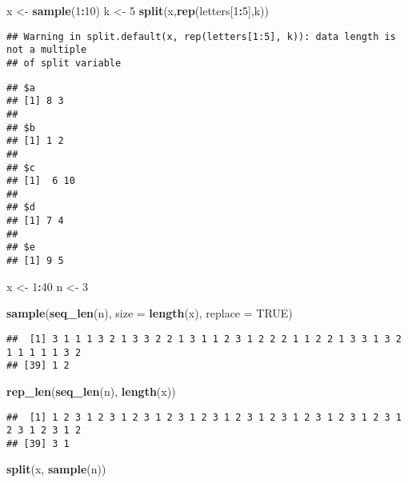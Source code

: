 \documentclass[]{article}
\newenvironment{Shaded}{\begin{snugshade}}{\end{snugshade}}
\newcommand{\DataTypeTok}[1]{\textcolor[rgb]{0.13,0.29,0.53}{#1}}
\newcommand{\DecValTok}[1]{\textcolor[rgb]{0.00,0.00,0.81}{#1}}
\newcommand{\KeywordTok}[1]{\textcolor[rgb]{0.13,0.29,0.53}{\textbf{#1}}}
\newcommand{\NormalTok}[1]{#1}
\newcommand{\OperatorTok}[1]{\textcolor[rgb]{0.81,0.36,0.00}{\textbf{#1}}}
\newcommand{\OtherTok}[1]{\textcolor[rgb]{0.56,0.35,0.01}{#1}}
\newcommand{\StringTok}[1]{\textcolor[rgb]{0.31,0.60,0.02}{#1}}
\begin{document}
\begin{Shaded}
\begin{Highlighting}[]
\NormalTok{x <-}\StringTok{ }\KeywordTok{sample}\NormalTok{(}\DecValTok{1}\OperatorTok{:}\DecValTok{10}\NormalTok{)}
\NormalTok{k <-}\StringTok{ }\DecValTok{5}
\KeywordTok{split}\NormalTok{(x,}\KeywordTok{rep}\NormalTok{(letters[}\DecValTok{1}\OperatorTok{:}\DecValTok{5}\NormalTok{],k))}
\end{Highlighting}
\end{Shaded}

\begin{verbatim}
## Warning in split.default(x, rep(letters[1:5], k)): data length is not a multiple
## of split variable
\end{verbatim}

\begin{verbatim}
## $a
## [1] 8 3
## 
## $b
## [1] 1 2
## 
## $c
## [1]  6 10
## 
## $d
## [1] 7 4
## 
## $e
## [1] 9 5
\end{verbatim}

\begin{Shaded}
\begin{Highlighting}[]
\NormalTok{x <-}\StringTok{ }\DecValTok{1}\OperatorTok{:}\DecValTok{40}
\NormalTok{n <-}\StringTok{ }\DecValTok{3}

\KeywordTok{sample}\NormalTok{(}\KeywordTok{seq_len}\NormalTok{(n), }\DataTypeTok{size =} \KeywordTok{length}\NormalTok{(x), }\DataTypeTok{replace =} \OtherTok{TRUE}\NormalTok{)}
\end{Highlighting}
\end{Shaded}

\begin{verbatim}
##  [1] 3 1 1 1 3 2 1 3 3 2 2 1 3 1 1 2 3 1 2 2 2 1 1 2 2 1 3 3 1 3 2 1 1 1 1 1 3 2
## [39] 1 2
\end{verbatim}

\begin{Shaded}
\begin{Highlighting}[]
\KeywordTok{rep_len}\NormalTok{(}\KeywordTok{seq_len}\NormalTok{(n), }\KeywordTok{length}\NormalTok{(x))}
\end{Highlighting}
\end{Shaded}

\begin{verbatim}
##  [1] 1 2 3 1 2 3 1 2 3 1 2 3 1 2 3 1 2 3 1 2 3 1 2 3 1 2 3 1 2 3 1 2 3 1 2 3 1 2
## [39] 3 1
\end{verbatim}

\begin{Shaded}
\begin{Highlighting}[]
\KeywordTok{split}\NormalTok{(x, }\KeywordTok{sample}\NormalTok{(n))}
\end{Highlighting}
\end{Shaded}
\end{document}
